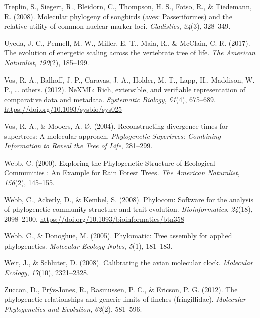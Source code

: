 \documentclass[english,man]{apa6}
\begin{document}
\leavevmode\hypertarget{ref-treplin2008molecular}{}%
Treplin, S., Siegert, R., Bleidorn, C., Thompson, H. S., Fotso, R., \& Tiedemann, R. (2008). Molecular phylogeny of songbirds (aves: Passeriformes) and the relative utility of common nuclear marker loci. \emph{Cladistics}, \emph{24}(3), 328--349.

\leavevmode\hypertarget{ref-uyeda2017evolution}{}%
Uyeda, J. C., Pennell, M. W., Miller, E. T., Maia, R., \& McClain, C. R. (2017). The evolution of energetic scaling across the vertebrate tree of life. \emph{The American Naturalist}, \emph{190}(2), 185--199.

\leavevmode\hypertarget{ref-vos2012nexml}{}%
Vos, R. A., Balhoff, J. P., Caravas, J. A., Holder, M. T., Lapp, H., Maddison, W. P., \ldots{} others. (2012). NeXML: Rich, extensible, and verifiable representation of comparative data and metadata. \emph{Systematic Biology}, \emph{61}(4), 675--689. \url{https://doi.org/10.1093/sysbio/sys025}

\leavevmode\hypertarget{ref-vos2004reconstructing}{}%
Vos, R. A., \& Mooers, A. Ø. (2004). Reconstructing divergence times for supertrees: A molecular approach. \emph{Phylogenetic Supertrees: Combining Information to Reveal the Tree of Life}, 281--299.

\leavevmode\hypertarget{ref-Webb2000}{}%
Webb, C. (2000). Exploring the Phylogenetic Structure of Ecological Communities : An Example for Rain Forest Trees. \emph{The American Naturalist}, \emph{156}(2), 145--155.

\leavevmode\hypertarget{ref-Webb2008}{}%
Webb, C., Ackerly, D., \& Kembel, S. (2008). Phylocom: Software for the analysis of phylogenetic community structure and trait evolution. \emph{Bioinformatics}, \emph{24}(18), 2098--2100. \url{https://doi.org/10.1093/bioinformatics/btn358}

\leavevmode\hypertarget{ref-webb2005phylomatic}{}%
Webb, C., \& Donoghue, M. (2005). Phylomatic: Tree assembly for applied phylogenetics. \emph{Molecular Ecology Notes}, \emph{5}(1), 181--183.

\leavevmode\hypertarget{ref-weir2008calibrating}{}%
Weir, J., \& Schluter, D. (2008). Calibrating the avian molecular clock. \emph{Molecular Ecology}, \emph{17}(10), 2321--2328.

\leavevmode\hypertarget{ref-zuccon2012phylogenetic}{}%
Zuccon, D., Prŷs-Jones, R., Rasmussen, P. C., \& Ericson, P. G. (2012). The phylogenetic relationships and generic limits of finches (fringillidae). \emph{Molecular Phylogenetics and Evolution}, \emph{62}(2), 581--596.

\endgroup
\end{document}
